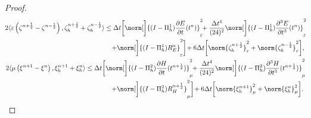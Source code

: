 \documentclass{amsart}
\theoremstyle{thmstyleone}%
\theoremstyle{thmstyletwo}%
\theoremstyle{thmstylethree}%
\newcommand{\ainnerproduct}[2]{\langle #1, #2 \rangle}
\begin{document}
\begin{proof}
\begin{gather*}
\begin{split}
2  \ainnerproduct{\varepsilon \left( \zeta^{n + \frac{1}{2}} - \zeta^{n - \frac{1}{2}} \right)}{\zeta^{n + \frac{1}{2}}_h + \zeta^{n - \frac{1}{2}}_h} \le \Delta t \bigg[ \norm[\bigg]{(I - \Pi_h^1) \dfrac{\partial E}{\partial t}(t^n)}^2_{\varepsilon} \!\! + \dfrac{\Delta t^4}{(24)^2} \norm[\bigg]{(I - \Pi_h^1) \dfrac{\partial^3 E}{\partial t^3}(t^n)}^2_{\varepsilon} \!\! \\  +  \norm[\bigg]{(I - \Pi_h^1) R_E^n}^2_{\varepsilon} \bigg] \! + 6 \Delta t \bigg[ \norm{\zeta_h^{n + \frac{1}{2}}}^2_{\varepsilon} + \norm{\zeta_h^{n - \frac{1}{2}}}^2_{\varepsilon} \bigg],
\end{split} \\ 
\begin{split}
2 \ainnerproduct{\mu \left( \xi^{n + 1} - \xi^n \right)}{\xi^{n + 1}_h + \xi^n_h} \le \Delta t \bigg[ \norm[\bigg]{(I - \Pi_h^2) \dfrac{\partial H}{\partial t}(t^{n + \frac{1}{2}})}^2_{\mu} \!\! + \dfrac{\Delta t^4}{(24)^2} \norm[\bigg]{(I - \Pi_h^2) \dfrac{\partial^3 H}{\partial t^3}(t^{n + \frac{1}{2}})}^2_{\mu} \!\! \\  +  \norm[\bigg]{(I - \Pi_h^2) R_H^{n + \frac{1}{2}}}^2_{\mu} \bigg] \! + 6 \Delta t \bigg[ \norm{\xi_h^{n + 1}}^2_{\mu} + \norm{\xi_h^n}^2_{\mu} \bigg].
\end{split}
\end{gather*}


\end{proof}
\end{document}
